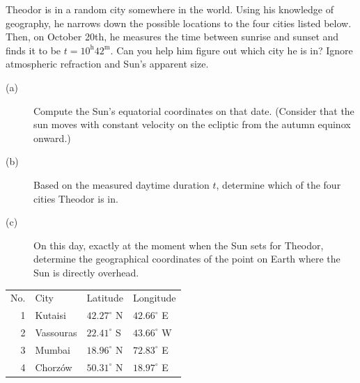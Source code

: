 Theodor is in a random city somewhere in the world. Using his knowledge of geography, he narrows down the possible locations to the four cities listed below. Then, on October 20th, he measures the time between sunrise and sunset and finds it to be $t=10^{\mathrm h}42^{\mathrm m}$.
Can you help him figure out which city he is in? Ignore atmospheric refraction and Sun's apparent size.
\begin{description}
\item[(a)] Compute the Sun's equatorial coordinates on that date. (Consider that the sun moves with constant velocity on the ecliptic from the autumn equinox onward.)
\item[(b)] Based on the measured daytime duration $t$, determine which of the four cities Theodor is in.
\item[(c)] On this day, exactly at the moment when the Sun sets for Theodor, determine the geographical coordinates of the point on Earth where the Sun is directly overhead.
\end{description}
\begin{center}
\begin{tabular}{rlll}
No. & City & Latitude & Longitude\\
1 & Kutaisi & $42.27^\circ$ N & $42.66^\circ$ E\\
2 & Vassouras & $22.41^\circ$ S & $43.66^\circ$ W\\
3 & Mumbai & $18.96^\circ$ N & $72.83^\circ$ E\\
4 & Chorz\'ow & $50.31^\circ$ N & $18.97^\circ$ E\\
\end{tabular}
\end{center}
